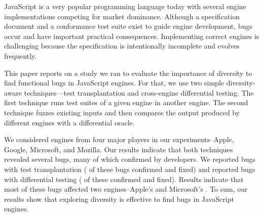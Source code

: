 JavaScript is a very popular programming language today with several
engine implementations competing for market dominance. Although a
specification document and a conformance test suite exist to guide
engine development, bugs occur and have important practical
consequences. Implementing correct
engines is challenging because the specification is intentionally
incomplete and evolves frequently.

This paper reports on a study we ran to evaluate the importance of
diversity to find functional bugs in JavaScript engines. For that, we
use two simple diversity-aware techniques---test transplantation and
cross-engine differential testing. The first technique runs test
suites of a given engine in another engine. The second technique
fuzzes existing inputs and then compares the output produced by
different engines with a differential oracle.

We considered engines from four major players in our
experiments--Apple, Google, Microsoft, and Mozilla. Our results
indicate that both techniques revealed several bugs, many of which
confirmed by developers. We reported \noBugsTransplantation{} bugs
with test transplantation (\noBugsTransplantationConfirmed{} of these bugs
confirmed and \noBugsTransplantationFixed{} fixed) and reported
\noBugsDifferentialTesting{} bugs with differential testing
(\noBugsDifferentialTestingConfirmed{} of these confirmed
and \noBugsDifferentialTestingFixed{} fixed). Results indicate that
most of these bugs affected two engines--Apple's
\jsc{} and Microsoft's \chakra{}. To sum, our results show that
exploring diversity is effective to find bugs in JavaScript engines.


